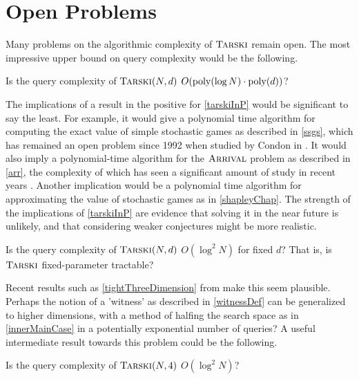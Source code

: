 \section{Open Problems}
Many problems on the algorithmic complexity of $\textsc{Tarski}$ remain 
open. The most impressive upper bound on query complexity would be the following.
\begin{open} \label{tarskiInP}
  Is the query complexity of $\textsc{Tarski}(N, d)$ $O(\mathrm{poly}(\log N) \cdot \mathrm{poly}(d))$?
\end{open}
The implications of a result in the positive for \cref{tarskiInP} would be significant to say the least.
For example, it would give a polynomial time algorithm for
computing the exact value of simple stochastic games as described in \cref{ssgs},
which has remained an open problem since 1992 when studied by Condon in \citep{condon}.
It would also imply a polynomial-time algorithm for the $\textsc{Arrival}$ problem as described in \cref{arr},
the complexity of which has seen a significant amount of study in recent years
\citep{gärtner2021subexponential, gärtner2018arrival, arrivalBasic, arrLowerBound}.
Another implication would be a polynomial time algorithm for approximating the value of
stochastic games as in \cref{shapleyChap}. The strength of the implications of \cref{tarskiInP}
are evidence that solving it in the near future is unlikely, and that considering weaker conjectures
might be more realistic.
\begin{open} \label{tarskiFixedParameterTractable}
  Is the query complexity of 
  $\textsc{Tarski}(N, d)$ $O(\log^2 N)$ for fixed $d$? That is, is $\textsc{Tarski}$ fixed-parameter tractable?
\end{open}
Recent results such as \cref{tightThreeDimension} from \citep{fasterTarski} make this seem
plausible. Perhaps the notion of a 'witness' as described in \cref{witnessDef} can be
generalized to higher dimensions, with a method of halfing the search space as in \cref{innerMainCase}
in a potentially exponential number of queries? A useful intermediate result towards this problem could be
the following.
\begin{open} \label{tightFourDimension}
  Is the query complexity of $\textsc{Tarski}(N, 4)$ $O(\log^2 N)$?
\end{open}
